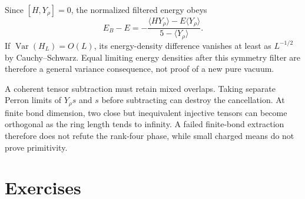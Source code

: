 Since $[H,Y_\rho]=0$, the normalized filtered energy obeys
\[
 E_B-E=-\frac{\langle HY_\rho\rangle-E\langle Y_\rho\rangle}
                 {5-\langle Y_\rho\rangle}.
\]
If $\operatorname{Var}(H_L)=O(L)$, its energy-density difference
vanishes at least as $L^{-1/2}$ by Cauchy--Schwarz. Equal limiting
energy densities after this symmetry filter are therefore a general
variance consequence, not proof of a new pure vacuum.

A coherent tensor subtraction must retain mixed overlaps. Taking
separate Perron limits of $Y_\rho s$ and $s$ before subtracting can
destroy the cancellation. At finite bond dimension, two close but
inequivalent injective tensors can become orthogonal as the ring
length tends to infinity. A failed finite-bond extraction therefore
does not refute the rank-four phase, while small charged means do
not prove primitivity.

\section{Exercises}

